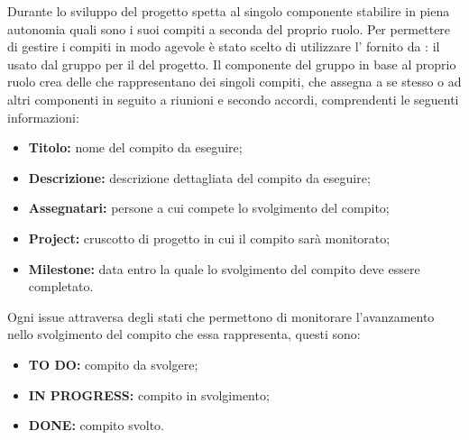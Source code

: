 \label{GestioneCompiti}
Durante lo sviluppo del progetto spetta al singolo componente stabilire in piena autonomia quali sono i suoi compiti a seconda del proprio ruolo.
Per permettere di gestire i compiti in modo agevole è stato scelto di utilizzare l' fornito da : il  usato dal gruppo per il  del progetto.
Il componente del gruppo in base al proprio ruolo crea delle  che rappresentano dei singoli compiti, che assegna a se stesso o ad altri componenti in seguito a riunioni e secondo accordi, comprendenti le seguenti informazioni:
\begin{itemize}
	\item \textbf{Titolo:} nome del compito da eseguire;
	\item \textbf{Descrizione:} descrizione dettagliata del compito da eseguire;
	\item \textbf{Assegnatari:} persone a cui compete lo svolgimento del compito;
	\item \textbf{Project:} cruscotto di progetto in cui il compito sarà monitorato;
	\item \textbf{Milestone:} data entro la quale lo svolgimento del compito deve essere completato.
\end{itemize}
Ogni issue attraversa degli stati che permettono di monitorare l'avanzamento nello svolgimento del compito che essa rappresenta, questi sono:
\begin{itemize}
	\item \textbf{TO DO:} compito da svolgere;
	\item \textbf{IN PROGRESS:} compito in svolgimento;
	\item \textbf{DONE:} compito svolto.
\end{itemize}

